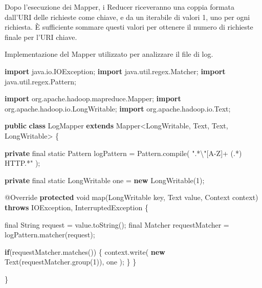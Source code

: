 \documentclass[italian,a4paper, twoside, 12pt]{report}
\newenvironment{Shaded}{}{}
\newcommand{\KeywordTok}[1]{\textcolor[rgb]{0.00,0.44,0.13}{\textbf{#1}}}
\newcommand{\DataTypeTok}[1]{\textcolor[rgb]{0.56,0.13,0.00}{#1}}
\newcommand{\DecValTok}[1]{\textcolor[rgb]{0.25,0.63,0.44}{#1}}
\newcommand{\SpecialCharTok}[1]{\textcolor[rgb]{0.25,0.44,0.63}{#1}}
\newcommand{\StringTok}[1]{\textcolor[rgb]{0.25,0.44,0.63}{#1}}
\newcommand{\ImportTok}[1]{#1}
\newcommand{\FunctionTok}[1]{\textcolor[rgb]{0.02,0.16,0.49}{#1}}
\newcommand{\BuiltInTok}[1]{#1}
\newcommand{\AttributeTok}[1]{\textcolor[rgb]{0.49,0.56,0.16}{#1}}
\newcommand{\NormalTok}[1]{#1}
\begin{document}
Dopo l'esecuzione dei Mapper, i Reducer riceveranno una coppia formata
dall'URI delle richieste come chiave, e da un iterabile di valori 1, uno
per ogni richiesta. È sufficiente sommare questi valori per ottenere il
numero di richieste finale per l'URI chiave.

\begin{codelisting}

\caption{Implementazione del Mapper utilizzato per analizzare il file di
log.}

\hypertarget{lst:log-mapper}{\label{lst:log-mapper}}
\begin{Shaded}
\begin{Highlighting}[numbers=left,,]
\KeywordTok{import}\ImportTok{ java.io.IOException;}
\KeywordTok{import}\ImportTok{ java.util.regex.Matcher;}
\KeywordTok{import}\ImportTok{ java.util.regex.Pattern;}

\KeywordTok{import}\ImportTok{ org.apache.hadoop.mapreduce.Mapper;}
\KeywordTok{import}\ImportTok{ org.apache.hadoop.io.LongWritable;}
\KeywordTok{import}\ImportTok{ org.apache.hadoop.io.Text;}

\KeywordTok{public} \KeywordTok{class}\NormalTok{ LogMapper }\KeywordTok{extends}\NormalTok{ Mapper<LongWritable, }\BuiltInTok{Text}\NormalTok{, }\BuiltInTok{Text}\NormalTok{, LongWritable> \{}

    \KeywordTok{private} \DataTypeTok{final} \DataTypeTok{static} \BuiltInTok{Pattern}\NormalTok{ logPattern = }\BuiltInTok{Pattern}\NormalTok{.}\FunctionTok{compile}\NormalTok{(}
        \StringTok{".*}\SpecialCharTok{\textbackslash{}"}\StringTok{[A-Z]+ (.*) HTTP.*"}
\NormalTok{    );}

    \KeywordTok{private} \DataTypeTok{final} \DataTypeTok{static}\NormalTok{ LongWritable one = }\KeywordTok{new} \FunctionTok{LongWritable}\NormalTok{(}\DecValTok{1}\NormalTok{);}

    \AttributeTok{@Override}
    \KeywordTok{protected} \DataTypeTok{void} \FunctionTok{map}\NormalTok{(LongWritable key, }\BuiltInTok{Text}\NormalTok{ value, }\BuiltInTok{Context}\NormalTok{ context)}
            \KeywordTok{throws} \BuiltInTok{IOException}\NormalTok{, }\BuiltInTok{InterruptedException}\NormalTok{ \{}

        \DataTypeTok{final} \BuiltInTok{String}\NormalTok{ request = value.}\FunctionTok{toString}\NormalTok{();}
        \DataTypeTok{final} \BuiltInTok{Matcher}\NormalTok{ requestMatcher = logPattern.}\FunctionTok{matcher}\NormalTok{(request);}

        \KeywordTok{if}\NormalTok{(requestMatcher.}\FunctionTok{matches}\NormalTok{()) \{}
\NormalTok{            context.}\FunctionTok{write}\NormalTok{(}
                \KeywordTok{new} \BuiltInTok{Text}\NormalTok{(requestMatcher.}\FunctionTok{group}\NormalTok{(}\DecValTok{1}\NormalTok{)),}
\NormalTok{                one}
\NormalTok{            );}
\NormalTok{        \}}
\NormalTok{    \}}

\NormalTok{\}}
\end{Highlighting}
\end{Shaded}

\end{codelisting}
\end{document}
